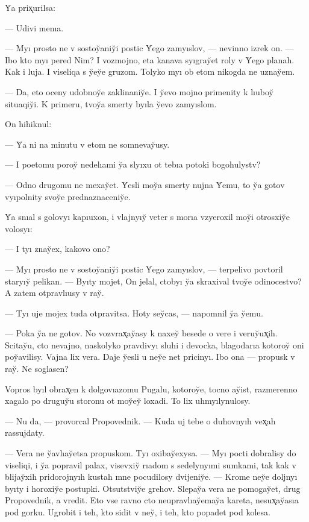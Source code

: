 \documentclass[10pt]{book}
\begin{document}
Y̆a prix̨urilsa:

— Udivi menıa.

— Myı prosto ne v sostoy̆aniy̆i postic Y̆ego zamyıslov, — nevinno izrek on. — Ibo kto myı pered Nim? I vozmojno, eta kanava syıgray̆et roly v Y̆ego planah. Kak i luja. I viseliqa s y̆ey̆e gruzom. Tolyko myı ob etom nikogda ne uznay̆em.

— Da, eto oceny udobnoy̆e zaklinaniy̆e. I y̆evo mojno primenity k lıuboy̆ situaqiy̆i. K primeru, tvoy̆a smerty byıla y̆evo zamyıslom.

On hihiknul:

— Y̆a ni na minutu v etom ne somnevay̆usy.

— I poetomu poroy̆ nedelıami y̆a slyıxu ot tebıa potoki bogohulystv?

— Odno drugomu ne mexay̆et. Y̆esli moy̆a smerty nujna Y̆emu, to y̆a gotov vyıpolnity svoy̆e prednaznaceniy̆e.

Y̆a snıal s golovyı kapıuxon, i vlajnyıy̆ veter s morıa vzyeroxil moy̆i otrosxiy̆e volosyı:

— I tyı znay̆ex, kakovo ono?

— Myı prosto ne v sostoy̆aniy̆i postic Y̆ego zamyıslov, — terpelivo povtoril staryıy̆ pelikan. — Byıty mojet, On jelal, ctobyı y̆a skraxival tvoy̆e odinocestvo? A zatem otpravlıusy v ray̆.

— Tyı uje mojex tuda otpravitsa. Hoty sey̆cas, — napomnil y̆a y̆emu.

— Poka y̆a ne gotov. No vozvrax̨ay̆asy k naxey̆ besede o vere i veruy̆ux̨ih. Scitay̆u, cto nevajno, naskolyko pravdivyı sluhi i devocka, blagodarıa kotoroy̆ oni poy̆avilisy. Vajna lix vera. Daje y̆esli u ney̆e net pricinyı. Ibo ona — propusk v ray̆. Ne soglasen?

Vopros byıl obrax̨en k dolgovıazomu Pugalu, kotoroy̆e, tocno ay̆ist, razmerenno xagalo po druguy̆u storonu ot moy̆ey̆ loxadi. To lix uhmyılynulosy.

— Nu da, — provorcal Propovednik. — Kuda uj tebe o duhovnyıh vex̨ah rassujdaty.

— Vera ne y̆avlıay̆etsa propuskom. Tyı oxibay̆exysa. — Myı pocti dobralisy do viseliqi, i y̆a popravil palax, visevxiy̆ rıadom s sedelynyımi sumkami, tak kak v blijay̆xih pridorojnyıh kustah mne pocudilosy dvijeniy̆e. — Krome ney̆e doljnyı byıty i horoxiy̆e postupki. Otsutstviy̆e grehov. Slepay̆a vera ne pomogay̆et, drug Propovednik, a vredit. Eto vse ravno cto neupravlıay̆emay̆a kareta, nesux̨ay̆asıa pod gorku. Ugrobit i teh, kto sidit v ney̆, i teh, kto popadet pod kolesa.
\end{document}
